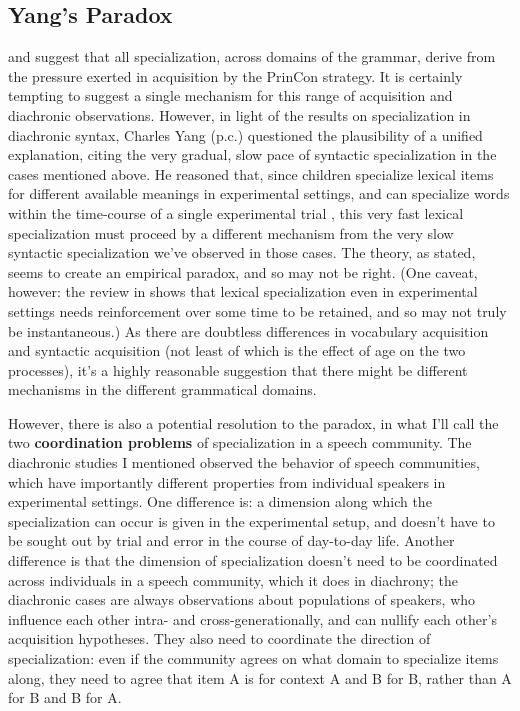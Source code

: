 \documentclass{artikel3}
\begin{document}
\subsection{Yang's Paradox}
\label{yangparadox}

\citet{wallenberg2016} and \citet{fruehwaldwallenberginprep} suggest that all specialization, across domains of the grammar, derive from the pressure exerted in acquisition by the PrinCon strategy. It is certainly tempting to suggest a single mechanism for this range of acquisition and diachronic observations. However, in light of the results on specialization in diachronic syntax, Charles Yang (p.c.) questioned the plausibility of a unified explanation, citing the very gradual, slow pace of syntactic specialization in the cases mentioned above. He reasoned that, since children specialize lexical items for different available meanings in experimental settings, and can specialize words within the time-course of a single experimental trial \citep[e.g. the classic study][]{markmanwachtel1988}, this very fast lexical specialization must proceed by a different mechanism from the very slow syntactic specialization we've observed in those cases. The theory, as stated, seems to create an empirical paradox, and so may not be right. (One caveat, however: the review in \citealt{bionetal2013} shows that lexical specialization even in experimental settings needs reinforcement over some time to be retained, and so may not truly be instantaneous.) As there are doubtless differences in vocabulary acquisition and syntactic acquisition (not least of which is the effect of age on the two processes), it's a highly reasonable suggestion that there might be different mechanisms in the different grammatical domains.

However, there is also a potential resolution to the paradox, in what I'll call the two \textbf{coordination problems} of specialization in a speech community. The diachronic studies I mentioned observed the behavior of speech communities, which have importantly different properties from individual speakers in experimental settings.  One difference is: a dimension along which the specialization can occur is given in the experimental setup, and doesn't have to be sought out by trial and error in the course of day-to-day life. Another difference is that the dimension of specialization doesn't need to be coordinated across individuals in a speech community, which it does in diachrony; the diachronic cases are always observations about populations of speakers, who influence each other intra- and cross-generationally, and can nullify each other's acquisition hypotheses. They also need to coordinate the direction of specialization: even if the community agrees on what domain to specialize items along, they need to agree that item A is for context A and B for B, rather than A for B and B for A. 
\end{document}
